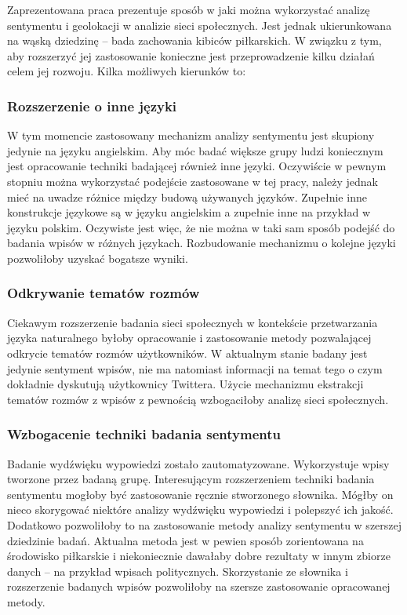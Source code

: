 Zaprezentowana praca prezentuje sposób w jaki można wykorzystać
analizę sentymentu i geolokacji w analizie sieci społecznych. Jest jednak
ukierunkowana na wąską dziedzinę -- bada zachowania kibiców piłkarskich.
W związku z tym, aby rozszerzyć jej zastosowanie konieczne jest przeprowadzenie
kilku działań celem jej rozwoju. Kilka możliwych kierunków to:

\subsubsection{Rozszerzenie o inne języki}
W tym momencie zastosowany mechanizm analizy sentymentu jest skupiony jedynie na
języku angielskim. Aby móc badać większe grupy ludzi koniecznym jest opracowanie
techniki badającej również inne języki. Oczywiście w pewnym stopniu można 
wykorzystać podejście zastosowane w tej pracy, należy jednak mieć na uwadze
różnice między budową używanych języków. Zupełnie inne konstrukcje językowe
są w języku angielskim a zupełnie inne na przykład w języku polskim.
Oczywiste jest więc, że nie można w taki sam sposób podejść do badania
wpisów w różnych językach. Rozbudowanie mechanizmu o kolejne języki pozwoliłoby
uzyskać bogatsze wyniki.

\subsubsection{Odkrywanie tematów rozmów}
Ciekawym rozszerzenie badania sieci społecznych w kontekście przetwarzania
języka naturalnego byłoby opracowanie i zastosowanie metody pozwalającej
odkrycie tematów rozmów użytkowników. W aktualnym stanie badany jest jedynie
sentyment wpisów, nie ma natomiast informacji na temat tego o czym dokładnie
dyskutują użytkownicy Twittera. Użycie mechanizmu ekstrakcji tematów rozmów
z wpisów z pewnością wzbogaciłoby analizę sieci społecznych.


\subsubsection{Wzbogacenie techniki badania sentymentu}
Badanie wydźwięku wypowiedzi zostało zautomatyzowane. Wykorzystuje wpisy
tworzone przez badaną grupę. Interesującym rozszerzeniem techniki badania 
sentymentu mogłoby być zastosowanie ręcznie stworzonego słownika.
Mógłby on nieco skorygować niektóre analizy wydźwięku wypowiedzi i polepszyć
ich jakość. Dodatkowo pozwoliłoby to na zastosowanie metody analizy sentymentu
w szerszej dziedzinie badań. Aktualna metoda jest w pewien sposób zorientowana
na środowisko piłkarskie i niekoniecznie dawałaby dobre rezultaty w innym
zbiorze danych -- na przykład wpisach politycznych. Skorzystanie ze słownika
i rozszerzenie badanych wpisów pozwoliłoby na szersze zastosowanie opracowanej 
metody.

